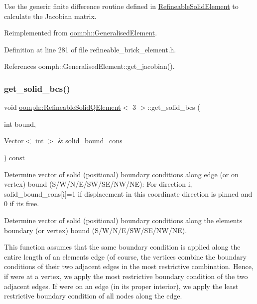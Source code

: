 Use the generic finite difference routine defined in \hyperlink{classoomph_1_1RefineableSolidElement}{Refineable\+Solid\+Element} to calculate the Jacobian matrix. 



Reimplemented from \hyperlink{classoomph_1_1GeneralisedElement_ab915bdad7e6643e5e73a6d98bc7cf48e}{oomph\+::\+Generalised\+Element}.



Definition at line 281 of file refineable\+\_\+brick\+\_\+element.\+h.



References oomph\+::\+Generalised\+Element\+::get\+\_\+jacobian().

\mbox{\label{classoomph_1_1RefineableSolidQElement_3_013_01_4_a57590ae1b7cb21cc362a371eef096217}} 
\subsubsection{\texorpdfstring{get\+\_\+solid\+\_\+bcs()}{get\_solid\_bcs()}}
{\footnotesize\ttfamily void \hyperlink{classoomph_1_1RefineableSolidQElement}{oomph\+::\+Refineable\+Solid\+Q\+Element}$<$ 3 $>$\+::get\+\_\+solid\+\_\+bcs (\begin{DoxyParamCaption}\item[{int}]{bound,  }\item[{\hyperlink{classoomph_1_1Vector}{Vector}$<$ int $>$ \&}]{solid\+\_\+bound\+\_\+cons }\end{DoxyParamCaption}) const}



Determine vector of solid (positional) boundary conditions along edge (or on vertex) bound (S/\+W/\+N/\+E/\+S\+W/\+S\+E/\+N\+W/\+NE)\+: For direction i, solid\+\_\+bound\+\_\+cons\mbox{[}i\mbox{]}=1 if displacement in this coordinate direction is pinned and 0 if it\textquotesingle{}s free. 

Determine vector of solid (positional) boundary conditions along the element\textquotesingle{}s boundary (or vertex) bound (S/\+W/\+N/\+E/\+S\+W/\+S\+E/\+N\+W/\+NE).

This function assumes that the same boundary condition is applied along the entire length of an element\textquotesingle{}s edge (of course, the vertices combine the boundary conditions of their two adjacent edges in the most restrictive combination. Hence, if we\textquotesingle{}re at a vertex, we apply the most restrictive boundary condition of the two adjacent edges. If we\textquotesingle{}re on an edge (in its proper interior), we apply the least restrictive boundary condition of all nodes along the edge.


